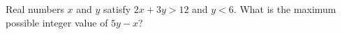 Real numbers $x$ and $y$ satisfy $2x+3y>12$ and $y<6$. What is the maximum possible integer value of $5y-x$?
